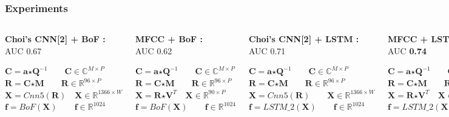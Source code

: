\documentclass{beamer}
\begin{document}
\begin{frame}
\frametitle{Experiments}
\begin{columns}[c]
\begin{block}{\textbf{Choi's CNN[2] + BoF :}\\ AUC 0.67 }

$\textbf{C} = \textbf{a} \bm{\star} \textbf{Q}^{-1} \qquad \textbf{C} \in \mathbb{C}^{M \times P}$\\
$\textbf{R} = \textbf{C} \bm{\star} \textbf{M} \qquad \textbf{R} \in \mathbb{R}^{96 \times P}$\\
$\textbf{X} =Cnn5(\textbf{R}) \quad \textbf{X} \in \mathbb{R}^{1366 \times W}$\\
$\textbf{f} = BoF(\textbf{X}) \qquad \textbf{f} \in \mathbb{R}^{1024}$\\
\end{block}
\begin{block}{\textbf{MFCC + BoF :}\\ AUC 0.62 }

$\textbf{C} = \textbf{a} \bm{\star} \textbf{Q}^{-1} \qquad \textbf{C} \in \mathbb{C}^{M \times P}$\\
$\textbf{R} = \textbf{C} \bm{\star} \textbf{M} \qquad \textbf{R} \in \mathbb{R}^{96 \times P}$\\
$\textbf{X} = \textbf{R} \bm{\star} \textbf{V}^{T} \quad \textbf{X} \in \mathbb{R}^{90 \times P}$\\
$\textbf{f} = BoF(\textbf{X}) \qquad \textbf{f} \in \mathbb{R}^{1024}$\\
\end{block}

\begin{block}{\textbf{Choi's CNN[2] + LSTM :}\\ AUC 0.71 }

$\textbf{C} = \textbf{a} \bm{\star} \textbf{Q}^{-1} \qquad \textbf{C} \in \mathbb{C}^{M \times P}$\\
$\textbf{R} = \textbf{C} \bm{\star} \textbf{M} \qquad \textbf{R} \in \mathbb{R}^{96 \times P}$\\
$\textbf{X} = Cnn5(\textbf{R}) \qquad \textbf{X} \in \mathbb{R}^{1366 \times W}$\\
$\textbf{f} = LSTM\_2(\textbf{X}) \qquad \textbf{f} \in \mathbb{R}^{1024}$\\
\end{block}
\begin{block}{\textbf{MFCC + LSTM :}\\ AUC \textbf{0.74} }

$\textbf{C} = \textbf{a} \bm{\star} \textbf{Q}^{-1} \qquad \textbf{C} \in \mathbb{C}^{M \times P}$\\
$\textbf{R} = \textbf{C} \bm{\star} \textbf{M} \qquad \textbf{R} \in \mathbb{R}^{96 \times P}$\\
$\textbf{X} = \textbf{R} \bm{\star} \textbf{V}^{T} \quad \textbf{X} \in \mathbb{R}^{90 \times P}$\\
$\textbf{f} = LSTM\_2(\textbf{X}) \qquad \textbf{f} \in \mathbb{R}^{1024}$\\
\end{block}

\end{columns}
\end{frame}
\end{document}
